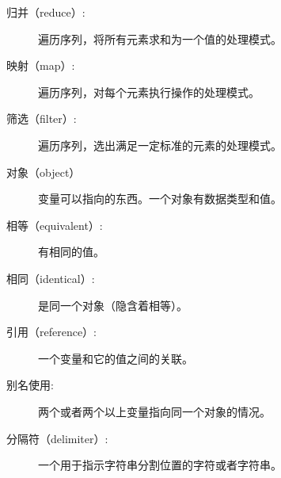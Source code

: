 \begin{description}
\item[归并（reduce）:] 遍历序列，将所有元素求和为一个值的处理模式。
  


\item[映射（map）:] 遍历序列，对每个元素执行操作的处理模式。
  


\item[筛选（filter）:] 遍历序列，选出满足一定标准的元素的处理模式。
  


\item[对象（object）] 变量可以指向的东西。一个对象有数据类型和值。


\item[相等（equivalent）:] 有相同的值。


\item[相同（identical）:] 是同一个对象（隐含着相等）。


\item[引用（reference）:] 一个变量和它的值之间的关联。


\item[别名使用:] 两个或者两个以上变量指向同一个对象的情况。


\item[分隔符（delimiter）:] 一个用于指示字符串分割位置的字符或者字符串。

\end{description}


